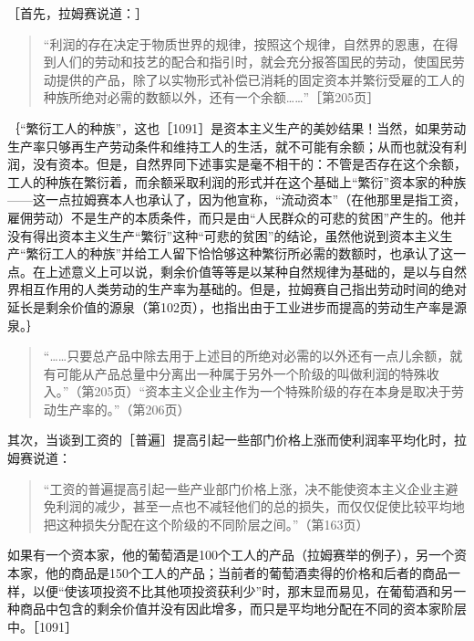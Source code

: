 ［首先，拉姆赛说道：］

\begin{quote}{“利润的存在决定于物质世界的规律，按照这个规律，自然界的恩惠，在得到人们的劳动和技艺的配合和指引时，就会充分报答国民的劳动，使国民劳动提供的产品，除了以实物形式补偿已消耗的固定资本并繁衍受雇的工人的种族所绝对必需的数额以外，还有一个余额……”［第205页］}\end{quote}

｛“繁衍工人的种族”，这也［1091］是资本主义生产的美妙结果！当然，如果劳动生产率只够再生产劳动条件和维持工人的生活，就不可能有余额；从而也就没有利润，没有资本。但是，自然界同下述事实是毫不相干的：不管是否存在这个余额，工人的种族在繁衍着，而余额采取利润的形式并在这个基础上“繁衍”资本家的种族——这一点拉姆赛本人也承认了，因为他宣称，“流动资本”（在他那里是指工资，雇佣劳动）不是生产的本质条件，而只是由“人民群众的可悲的贫困”产生的。他并没有得出资本主义生产“繁衍”这种“可悲的贫困”的结论，虽然他说到资本主义生产“繁衍工人的种族”并给工人留下恰恰够这种繁衍所必需的数额时，也承认了这一点。在上述意义上可以说，剩余价值等等是以某种自然规律为基础的，是以与自然界相互作用的人类劳动的生产率为基础的。但是，拉姆赛自己指出劳动时间的绝对延长是剩余价值的源泉（第102页），也指出由于工业进步而提高的劳动生产率是源泉。｝

\begin{quote}{“……只要总产品中除去用于上述目的所绝对必需的以外还有一点儿余额，就有可能从产品总量中分离出一种属于另外一个阶级的叫做利润的特殊收入。”（第205页）“资本主义企业主作为一个特殊阶级的存在本身是取决于劳动生产率的。”（第206页）}\end{quote}

其次，当谈到工资的［普遍］提高引起一些部门价格上涨而使利润率平均化时，拉姆赛说道：

\begin{quote}{“工资的普遍提高引起一些产业部门价格上涨，决不能使资本主义企业主避免利润的减少，甚至一点也不减轻他们的总的损失，而仅仅促使比较平均地把这种损失分配在这个阶级的不同阶层之间。”（第163页）}\end{quote}

如果有一个资本家，他的葡萄酒是100个工人的产品（拉姆赛举的例子），另一个资本家，他的商品是150个工人的产品；当前者的葡萄酒卖得的价格和后者的商品一样，以便“使该项投资不比其他项投资获利少”时，那末显而易见，在葡萄酒和另一种商品中包含的剩余价值并没有因此增多，而只是平均地分配在不同的资本家阶层中。［1091］

